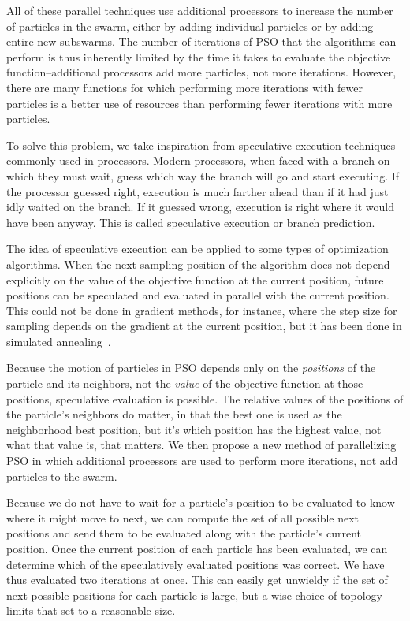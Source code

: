 \documentclass[conference,letterpaper]{IEEEtran}
\begin{document}
All of these parallel techniques use additional processors to increase the
number of particles in the swarm, either by adding individual particles or by
adding entire new subswarms.  The number of iterations of PSO that the
algorithms can perform is thus inherently limited by the time it takes to
evaluate the objective function--additional processors add more particles, not
more iterations.  However, there are many functions for which performing more
iterations with fewer particles is a better use of resources than performing
fewer iterations with more particles.  

To solve this problem, we take inspiration from speculative execution
techniques commonly used in processors.  Modern processors, when faced with a
branch on which they must wait, guess which way the branch will go and start
executing.  If the processor guessed right, execution is much farther ahead
than if it had just idly waited on the branch.  If it guessed wrong, execution
is right where it would have been anyway.  This is called speculative
execution or branch prediction.

The idea of speculative execution can be applied to some types of optimization
algorithms.  When the next sampling position of the algorithm does not depend
explicitly on the value of the objective function at the current position,
future positions can be speculated and evaluated in parallel with the current
position.  This could not be done in gradient methods, for instance, where the
step size for sampling depends on the gradient at the current position, but it
has been done in simulated annealing~\cite{witte-tpds91}.

Because the motion of particles in PSO depends only on the \emph{positions} of
the particle and its neighbors, not the \emph{value} of the objective function
at those positions, speculative evaluation is possible.  The relative values of
the positions of the particle's neighbors do matter, in that the best one is
used as the neighborhood best position, but it's which position has the highest
value, not what that value is, that matters.  We then propose a new method of
parallelizing PSO in which additional processors are used to perform more
iterations, not add particles to the swarm.

Because we do not have to wait for a particle's position to be evaluated to know
where it might move to next, we can compute the set of all possible next
positions and send them to be evaluated along with the particle's current
position.  Once the current position of each particle has been evaluated, we
can determine which of the speculatively evaluated positions was correct.  We
have thus evaluated two iterations at once.  This can easily get unwieldy if
the set of next possible positions for each particle is large, but a wise
choice of topology limits that set to a reasonable size.
\end{document}
